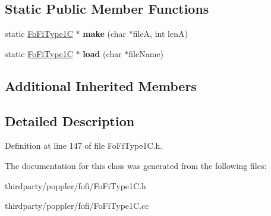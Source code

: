 \subsection*{Static Public Member Functions}
\begin{DoxyCompactItemize}
\item 
\mbox{\label{class_fo_fi_type1_c_a39721a4c96dde7c527397a40b3cffca6}} 
static \hyperlink{class_fo_fi_type1_c}{Fo\+Fi\+Type1C} $\ast$ {\bfseries make} (char $\ast$fileA, int lenA)
\item 
\mbox{\label{class_fo_fi_type1_c_a7c95838c7c97483174f323c8b35f06cc}} 
static \hyperlink{class_fo_fi_type1_c}{Fo\+Fi\+Type1C} $\ast$ {\bfseries load} (char $\ast$file\+Name)
\end{DoxyCompactItemize}
\subsection*{Additional Inherited Members}


\subsection{Detailed Description}


Definition at line 147 of file Fo\+Fi\+Type1\+C.\+h.



The documentation for this class was generated from the following files\+:\begin{DoxyCompactItemize}
\item 
thirdparty/poppler/fofi/Fo\+Fi\+Type1\+C.\+h\item 
thirdparty/poppler/fofi/Fo\+Fi\+Type1\+C.\+cc\end{DoxyCompactItemize}
